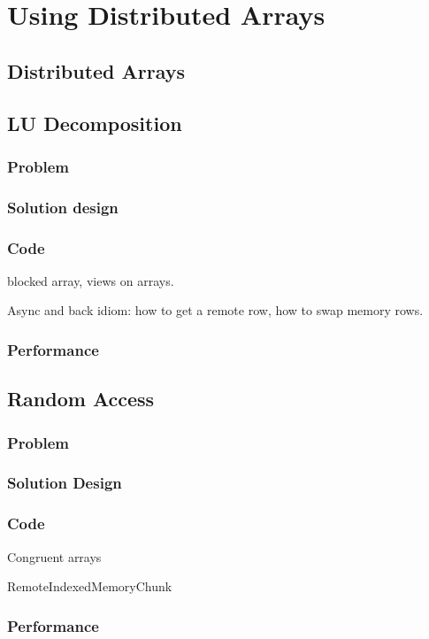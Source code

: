 \chapter{Using Distributed Arrays}
\section{Distributed Arrays}
\section{LU Decomposition}    \label{sec:LU}
\subsection{Problem}
\subsection{Solution design} 
\subsection{Code} 
      blocked array, views on arrays.

      Async and back idiom: how to get a remote row, how to swap memory rows.
\subsection{Performance}


\section{Random Access}\label{sec:random-access}
\subsection{Problem}
\subsection{Solution Design} 
\subsection{Code} 
       Congruent arrays

       RemoteIndexedMemoryChunk

\subsection{Performance}